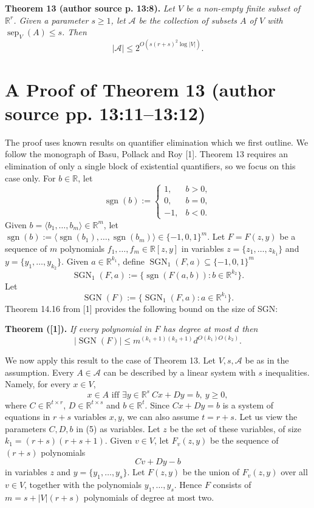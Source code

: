 \documentclass[10pt,a4paper]{article}
\newcommand{\sep}{\operatorname{sep}}
\newcommand{\SGN}{\operatorname{SGN}}
\newcommand{\sgn}{\operatorname{sgn}}
\newcommand{\RR}{\mathbb R}
\newenvironment{originalresult}[1]{\par\medskip\noindent\textbf{#1.}\itshape}{\par\medskip}
\begin{document}
\begin{originalresult}{Theorem 13 (author source p. 13:8)}
Let $V$ be a non-empty finite subset of $\RR^r$. Given a parameter $s\ge1$, let $\mathcal A$ be the collection of subsets $A$ of $V$ with $\sep_V(A)\le s$. Then
\[|\mathcal A|\le2^{O(s(r+s)^2\log|V|)}.\]
\end{originalresult}

\section*{A Proof of Theorem 13 (author source pp. 13:11--13:12)}
The proof uses known results on quantifier elimination which we first outline. We follow the monograph of Basu, Pollack and Roy [1]. Theorem 13 requires an elimination of only a single block of existential quantifiers, so we focus on this case only.
For $b\in\RR$, let
\[\sgn(b):=\begin{cases}1,&b>0,\\0,&b=0,\\-1,&b<0.\end{cases}\]
Given $b=\langle b_1,\ldots,b_m\rangle\in\RR^m$, let $\sgn(b):=\langle\sgn(b_1),\ldots,\sgn(b_m)\rangle\in\{-1,0,1\}^m$. Let $F=F(z,y)$ be a sequence of $m$ polynomials $f_1,\ldots,f_m\in\RR[z,y]$ in variables $z=\{z_1,\ldots,z_{k_1}\}$ and $y=\{y_1,\ldots,y_{k_2}\}$. Given $a\in\RR^{k_1}$, define $\SGN_1(F,a)\subseteq\{-1,0,1\}^m$
\[\SGN_1(F,a):=\{\sgn(F(a,b)):b\in\RR^{k_2}\}.\]
Let
\[\SGN(F):=\{\SGN_1(F,a):a\in\RR^{k_1}\}.\]
Theorem 14.16 from [1] provides the following bound on the size of SGN:
\begin{originalresult}{Theorem ([1])}
If every polynomial in $F$ has degree at most $d$ then
\[|\SGN(F)|\le m^{(k_1+1)(k_2+1)}d^{O(k_1)O(k_2)}.\tag{4}\]
\end{originalresult}
We now apply this result to the case of Theorem 13. Let $V,s,\mathcal A$ be as in the assumption. Every $A\in\mathcal A$ can be described by a linear system with $s$ inequalities. Namely, for every $x\in V$,
\[x\in A\text{ iff }\exists y\in\RR^s\ Cx+Dy=b,\ y\ge0,\tag{5}\]
where $C\in\RR^{t\times r}$, $D\in\RR^{t\times s}$ and $b\in\RR^t$. Since $Cx+Dy=b$ is a system of equations in $r+s$ variables $x,y$, we can also assume $t=r+s$.
Let us view the parameters $C,D,b$ in (5) as variables. Let $z$ be the set of these variables, of size $k_1=(r+s)(r+s+1)$. Given $v\in V$, let $F_v(z,y)$ be the sequence of $(r+s)$ polynomials
\[Cv+Dy-b\]
in variables $z$ and $y=\{y_1,\ldots,y_s\}$. Let $F(z,y)$ be the union of $F_v(z,y)$ over all $v\in V$, together with the polynomials $y_1,\ldots,y_s$. Hence $F$ consists of $m=s+|V|(r+s)$ polynomials of degree at most two.
\end{document}
